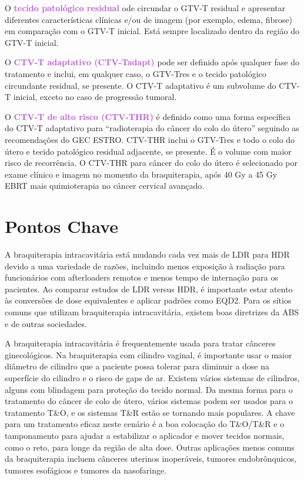 \documentclass[11pt,a4paper]{article}
\newcounter{exemplo}
\begin{document}
\begin{exemplo}
\begin{itemize}[label=\textcolor{CarnationPink}{$\blacksquare$}]
			O \textcolor{MediumOrchid}{\textbf{tecido patológico residual}} ode circundar o GTV-T residual e apresentar diferentes características clínicas e/ou de imagem (por exemplo, edema, fibrose) em comparação com o GTV-T inicial. Está sempre localizado dentro da região do GTV-T inicial.

			O \textcolor{MediumOrchid}{\textbf{CTV-T adaptativo (CTV-Tadapt)}} pode ser definido após qualquer fase do tratamento e inclui, em qualquer caso, o GTV-Tres e o tecido patológico circundante residual, se presente. O CTV-T adaptativo é um subvolume do CTV-T inicial, exceto no caso de progressão tumoral.

			O \textcolor{MediumOrchid}{\textbf{CTV-T de alto risco (CTV-THR)}} é definido como uma forma específica do CTV-T adaptativo para “radioterapia do câncer do colo do útero” seguindo as recomendações do GEC ESTRO. CTV-THR inclui o GTV-Tres e todo o colo do útero e tecido patológico residual adjacente, se presente. É o volume com maior risco de recorrência. O CTV-THR para câncer do colo do útero é selecionado por exame clínico e imagem no momento da braquiterapia, após 40 Gy a 45 Gy EBRT mais quimioterapia no câncer cervical avançado.

		\end{itemize}
	\end{exemplo}



	
\section{Pontos Chave}

	A braquiterapia intracavitária está mudando cada vez mais de LDR para HDR devido a uma variedade de razões, incluindo menos exposição à radiação para funcionários com afterloaders remotos e menos tempo de internação para os pacientes. Ao comparar estudos de LDR versus HDR, é importante estar atento às conversões de dose equivalentes e aplicar padrões como EQD2. Para os sítios comuns que utilizam braquiterapia intracavitária, existem boas diretrizes da ABS e de outras sociedades.

	A braquiterapia intracavitária é frequentemente usada para tratar cânceres ginecológicos. Na braquiterapia com cilindro vaginal, é importante usar o maior diâmetro de cilindro que a paciente possa tolerar para diminuir a dose na superfície do cilindro e o risco de gaps de ar. Existem vários sistemas de cilindros, alguns com blindagem para proteção do tecido normal. Da mesma forma para o tratamento do câncer de colo de útero, vários sistemas podem ser usados para o tratamento T\&O, e os sistemas T\&R estão se tornando mais populares. A chave para um tratamento eficaz neste cenário é a boa colocação do T\&O/T\&R e o tamponamento para ajudar a estabilizar o aplicador e mover tecidos normais, como o reto, para longe da região de alta dose. Outras aplicações menos comuns da braquiterapia incluem cânceres uterinos inoperáveis, tumores endobrônquicos, tumores esofágicos e tumores da nasofaringe.
\end{document}
